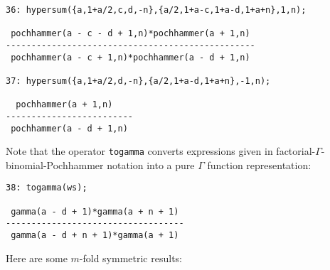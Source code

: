 {\small
\begin{verbatim}
36: hypersum({a,1+a/2,c,d,-n},{a/2,1+a-c,1+a-d,1+a+n},1,n);

 pochhammer(a - c - d + 1,n)*pochhammer(a + 1,n)
-------------------------------------------------
 pochhammer(a - c + 1,n)*pochhammer(a - d + 1,n)

37: hypersum({a,1+a/2,d,-n},{a/2,1+a-d,1+a+n},-1,n);

  pochhammer(a + 1,n)
-------------------------
 pochhammer(a - d + 1,n)
\end{verbatim}
}\noindent
Note that the operator {\tt togamma} converts expressions given in
factorial-$\Gamma$-binomial-Pochhammer notation
into a pure $\Gamma$ function representation:

{\small
\begin{verbatim}
38: togamma(ws);

 gamma(a - d + 1)*gamma(a + n + 1)
-----------------------------------
 gamma(a - d + n + 1)*gamma(a + 1)
\end{verbatim}
}\noindent
Here are some $m$-fold symmetric results:

